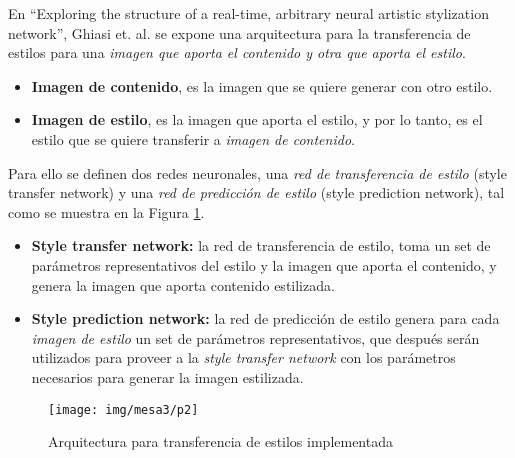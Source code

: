 En ``Exploring the structure of a real-time, arbitrary neural artistic stylization network'', Ghiasi et. al. \cite{ghiasiExploringStructureRealtime2017} se expone una arquitectura para la transferencia de estilos para una \emph{imagen que aporta el contenido y otra que aporta el estilo}.
\begin{itemize}
  \item \textbf{Imagen de contenido}, es la imagen que se quiere generar con otro estilo.
  \item \textbf{Imagen de estilo}, es la imagen que aporta el estilo, y por lo tanto, es el estilo que se quiere transferir a \emph{imagen de contenido}.
\end{itemize}


Para ello se definen dos redes neuronales, una \emph{red de transferencia de estilo} (style transfer network) y una \emph{red de predicción de estilo} (style prediction network), tal como se muestra en la Figura \ref{fig:arquitectura}.

\begin{itemize}
  \item \textbf{Style transfer network:} la red de transferencia de estilo, toma un set de parámetros representativos del estilo y la imagen que aporta el contenido, y genera la imagen que aporta contenido estilizada.
  \item \textbf{Style prediction network:} la red de predicción de estilo genera para cada \emph{imagen de estilo} un set de parámetros representativos, que después serán utilizados para proveer a la \emph{style transfer network} con los parámetros necesarios para generar la imagen estilizada.
\end{itemize}

\begin{figure}[H]
  \texttt{[image: img/mesa3/p2]}
  \centering
  \caption{Arquitectura para transferencia de estilos implementada}
  \label{fig:arquitectura}
  \end{figure}




